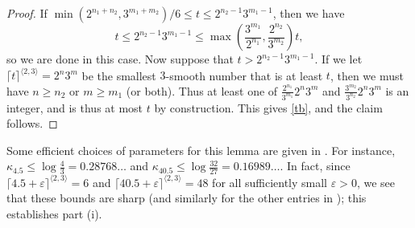\documentclass[10pt,a4paper,reqno]{amsart}
\numberwithin{equation}{section}
\theoremstyle{plain}
\theoremstyle{definition}
\newcommand\eps{\varepsilon}
\begin{document}
\begin{proof}  If $\min( 2^{n_1+n_2},3^{m_1+m_2})/6 \leq t \leq 2^{n_2-1} 3^{m_1-1}$, then we have
\begin{equation}\label{tb}
  t \leq 2^{n_2-1} 3^{m_1-1} \leq \max\left(\frac{3^{m_1}}{2^{n_1}}, \frac{2^{n_2}}{3^{m_2}}\right) t,
\end{equation}
so we are done in this case.  Now suppose that $t > 2^{n_2-1} 3^{m_1-1}$.
If we let $\lceil t \rceil^{\langle 2,3 \rangle} =2^n 3^m$ be the smallest $3$-smooth number that is at least $t$, then we must have $n \geq n_2$ or $m \geq m_1$ (or both).  Thus at least one of $\frac{2^{n_1}}{3^{m_1}} 2^n 3^m$ and $\frac{3^{m_2}}{3^{n_2}} 2^n 3^m$ is an integer, and is thus at most $t$ by construction.  This gives \eqref{tb}, and the claim follows.
\end{proof}

Some efficient choices of parameters for this lemma are given in .  For instance, $\kappa_{4.5} \leq \log\frac{4}{3} = 0.28768\dots$ and $\kappa_{40.5} \leq \log \frac{32}{27} = 0.16989\dots$.  In fact, since $\lceil 4.5+\eps \rceil^{\langle 2,3\rangle} = 6$ and $\lceil 40.5+\eps \rceil^{\langle 2,3\rangle} = 48$ for all sufficiently small $\eps>0$, we see that these bounds are sharp (and similarly for the other entries in ); this establishes part (i).
\end{document}
